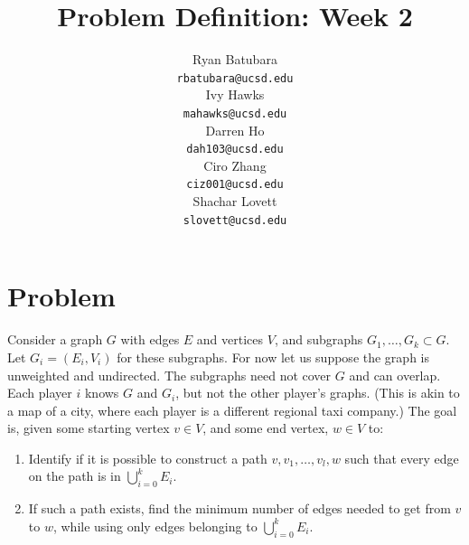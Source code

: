 \documentclass{article}
\title{Problem Definition: Week 2}
\author{
    Ryan Batubara \\ 
    {\tt \small{rbatubara@ucsd.edu}} \\\And
    Ivy Hawks \\
    {\tt \small{mahawks@ucsd.edu}} \\\And
    Darren Ho \\
    {\tt \small{dah103@ucsd.edu}} \\\And
    Ciro Zhang \\
    {\tt \small{ciz001@ucsd.edu}} \\\And
    Shachar Lovett \\
    {\tt \small{slovett@ucsd.edu}} \\}
\begin{document}
\section*{Problem}
Consider a graph $G$ with edges $E$ and vertices $V$, and subgraphs $G_1, \ldots, G_k \subset G$. Let $G_i = (E_i, V_i)$ for these subgraphs. For now let us suppose the graph is unweighted and undirected. The subgraphs need not cover $G$ and can overlap. Each player $i$ knows $G$ and $G_i$, but not the other player's graphs. (This is akin to a map of a city, where each player is a different regional taxi company.) The goal is, given some starting vertex $v \in V$, and some end vertex, $w \in V$ to:
\begin{enumerate}
	\item  Identify if it is possible to construct a path $v, v_1, \dots, v_l, w$ such that every edge on the path is in $\bigcup_{i=0}^{k} E_i$. \label{one}
	\item  If such a path exists, find the minimum number of edges needed to get from $v$ to $w$, while using only edges belonging to $\bigcup_{i=0}^{k} E_i$. \label{two}
\end{enumerate}

\end{document}
